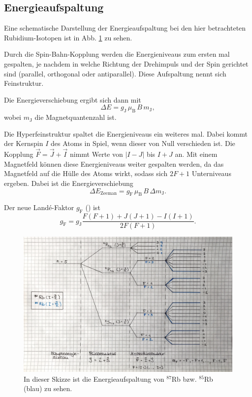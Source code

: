 \subsection{Energieaufspaltung}
Eine schematische Darstellung der Energieaufspaltung bei den hier betrachteten Rubidium-Isotopen ist in Abb. \ref{fig:Aufspaltung} zu sehen.

Durch die Spin-Bahn-Kopplung werden die Energieniveaus zum ersten mal gespalten, je nachdem in welche Richtung der Drehimpuls und der Spin gerichtet sind (parallel, orthogonal oder antiparallel).
Diese Aufspaltung nennt sich Feinstruktur. \cite{pfeiler}

Die Energieverschiebung ergibt sich dann mit 
\begin{equation*}
    \Delta E = g_\text{J} \, \mu_\text{B} \, B \, m_\text{J},
\end{equation*}
wobei $m_\text{J}$ die Magnetquantenzahl ist. \cite{pfeiler}

Die Hyperfeinstruktur spaltet die Energieniveaus ein weiteres mal. 
Dabei kommt der Kernspin $I$ des Atoms in Spiel, wenn dieser von Null verschieden ist.
Die Kopplung $\vec F = \vec J + \vec I$ nimmt Werte von $| I - J|$ bis $I+J$ an. 
Mit einem Magnetfeld können diese Energieniveaus weiter gespalten werden, da das Magnetfeld auf die Hülle des Atoms wirkt, sodass sich $2F+1$ Unterniveaus ergeben. 
Dabei ist die Energieverschiebung 
\begin{equation*}
    \Delta E_\text{Zeeman} = g_\text{F} \, \mu_\text{B} \, B \, \Delta m_\text{J}.
\end{equation*}
\cite{caltech}

Der neue Landé-Faktor $g_\text{F}$ (\cite{caltech}) ist 
\begin{equation}
    g_\text{F} = g_\text{J} \frac{F(F+1) + J(J+1) - I(I+1)}{2F(F+1)}.
    \label{eq:I}
\end{equation}

\begin{figure}
    \centering
    \includegraphics[width=15cm]{fotos/Aufspaltung.JPG}
    \caption{In dieser Skizze ist die Energieaufspaltung von $^{87}$Rb bzw. $^{85}$Rb (blau) zu sehen.}
    \label{fig:Aufspaltung}
\end{figure}

